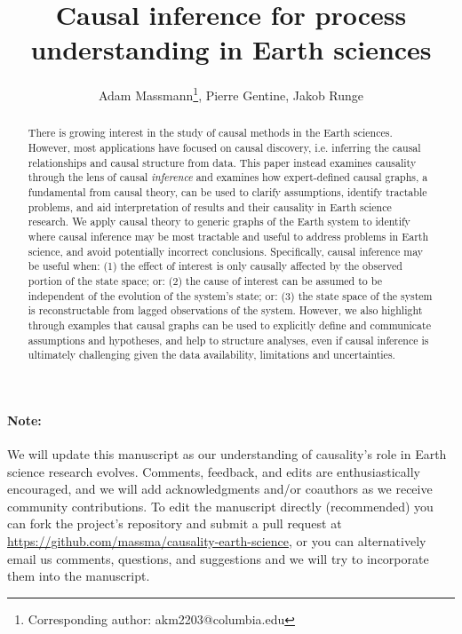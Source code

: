 \documentclass[12pt]{article}
\begin{document}
\title{Causal inference for process understanding in Earth sciences}

\author{Adam Massmann\thanks{Corresponding author:
    akm2203@columbia.edu}, Pierre Gentine, Jakob Runge}

\maketitle
\begin{abstract}
  There is growing interest in the study of causal methods in the
  Earth sciences. However, most applications have focused on causal
  discovery, i.e. inferring the causal relationships and causal
  structure from data. This paper instead examines causality through
  the lens of causal {\it inference} and examines how expert-defined
  causal graphs, a fundamental from causal theory, can be used to
  clarify assumptions, identify tractable problems, and aid
  interpretation of results and their causality in Earth science
  research. We apply causal theory to generic graphs of the Earth
  system to identify where causal inference may be most tractable and
  useful to address problems in Earth science, and avoid potentially
  incorrect conclusions. Specifically, causal inference may be useful
  when: (1) the effect of interest is only causally affected by the
  observed portion of the state space; or: (2) the cause of interest
  can be assumed to be independent of the evolution of the system’s
  state; or: (3) the state space of the system is reconstructable from
  lagged observations of the system. However, we also highlight
  through examples that causal graphs can be used to explicitly define
  and communicate assumptions and hypotheses, and help to structure
  analyses, even if causal inference is ultimately challenging given
  the data availability, limitations and uncertainties.
\end{abstract}

\paragraph{Note:} We will update this manuscript as our understanding
of causality's role in Earth science research evolves. Comments,
feedback, and edits are enthusiastically encouraged, and we will add
acknowledgments and/or coauthors as we receive community
contributions. To edit the manuscript directly (recommended) you can
fork the project's repository and submit a pull request at
\url{https://github.com/massma/causality-earth-science}, or you can
alternatively email us comments, questions, and suggestions and we
will try to incorporate them into the manuscript.
\end{document}
